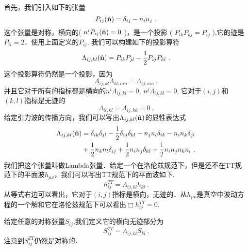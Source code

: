首先，我们引入如下的张量
\begin{equation}
P_{ij} (\hat{\bf{n}} ) = \delta_{ij} - n_in_j~.
\end{equation}
这个张量是对称，横向的( $ n^iP_{ij}(\hat{\bf{n}}) = 0 $ )，是一个投影 ( $ P_{ik} P_{kj} = P_{ij} $ ),它的迹是$P_{ii} = 2$．使用上面定义的$P_{ij}$, 我们可以构建如下的投影算符
\begin{equation}
\Lambda_{ij,kl} ( \hat{\bf{n}} )  = P_{ik} P_{jl} - \frac{1}{2} P_{ij} P_{kl} ~. 
\end{equation}
这个投影算符仍然是一个投影，因为
\begin{equation}
\Lambda_{ij,kl} \Lambda_{kl,mn} = \Lambda_{ij,mn} ~. 
\end{equation}
并且它对于所有的指标都是横向的$ n^i \Lambda_{ij,kl} = 0 $, $ n^j \Lambda_{ij,kl} = 0 $, 它对于$(i,j)$和$(k,l)$指标是无迹的
\begin{equation}
\Lambda_{ii,kl} = \Lambda_{ij,kk} = 0 ~. 
\end{equation}
给定引力波的传播方向，我们可以写出$\Lambda_{ij,kl} (\hat{ {\bf n} })$的显性表达式
\begin{equation}
\begin{aligned}
\Lambda_{ij,kl} (\hat{ {\bf n} }   ) & = \delta_{ik} \delta_{jl} - \frac{1}{2} \delta_{ij} \delta_{kl} - n_j n_l \delta_{ik} - n_i n_k \delta_{jl} \\
& + \frac{1}{2} n_k n_l \delta_{ij} + \frac{1}{2} n_i n_j \delta_{kl} + \frac{1}{2} n_i n_j n_k n_l ~.
\end{aligned}
\end{equation}
我们把这个张量叫做Lambda张量．给定一个在洛伦兹规范下，但是还不在TT规范下的平面波$h_{\mu\nu}$，我们可以写出TT规范下的平面波如下.
\begin{equation}
h_{ij}^{TT} = \Lambda_{ij,kl} h_{kl} ~.
\end{equation}
从等式右边可以看出，它对于$(i,j)$指标是横向，无迹的．从$h_{\mu\nu}$是真空中波动方程的一个解和它在洛伦兹规范下可以看出$\Box h_{ij}^{TT} = 0$. 

给定任意的对称张量$S_{ij}$,我们定义它的横向无迹部分为
\begin{equation}
S^{TT}_{ij} = \Lambda_{ij,kl} S_{kl} ~.
\end{equation}
注意到$S^{TT}_{ij}$仍然是对称的．

